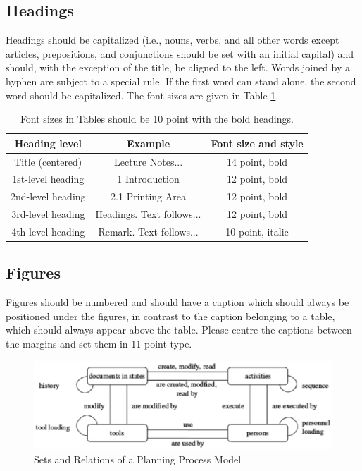 \documentclass[12pt]{article}
\begin{document}
\subsection{Headings}

Headings should be capitalized (i.e., nouns, verbs, and all other words except articles, prepositions, and conjunctions should be set with an initial capital) and should, with the exception of the title, be aligned to the left. Words joined by a hyphen are subject to a special rule. If the first word can stand alone, the second word should be capitalized. The font sizes are given in Table \ref{table:example}.

\begin{table}
\begin{center}
\caption{Font sizes in Tables should be 10 point with the bold headings.}
\label{table:example}
\begin{tabular}{|c|c|c|} \hline
\textbf{Heading level} & \textbf{Example} & \textbf{Font size and style} \\ \hline 
Title (centered) & Lecture Notes... & 14 point, bold \\ \hline
1st-level heading & 1 Introduction & 12 point, bold \\ \hline
2nd-level heading & 2.1 Printing Area & 12 point, bold \\ \hline
3rd-level heading & Headings.  Text follows... & 12 point, bold \\ \hline
4th-level heading & Remark.  Text follows... & 10 point, italic \\ \hline
\end{tabular}
\end{center}
\end{table}

\subsection{Figures}
Figures should be numbered and should have a caption which should always be positioned under the figures, in contrast to the caption belonging to a table, which should always appear above the table. Please centre the captions between the margins and set them in 11-point type. 

\begin{figure}[!ht]
	\begin{center}
	\includegraphics[width=140mm]{figure1.eps}
	\caption{Sets and Relations of a Planning Process Model}
	\label{figure:example1}
	\end{center}
\end{figure}
\end{document}
